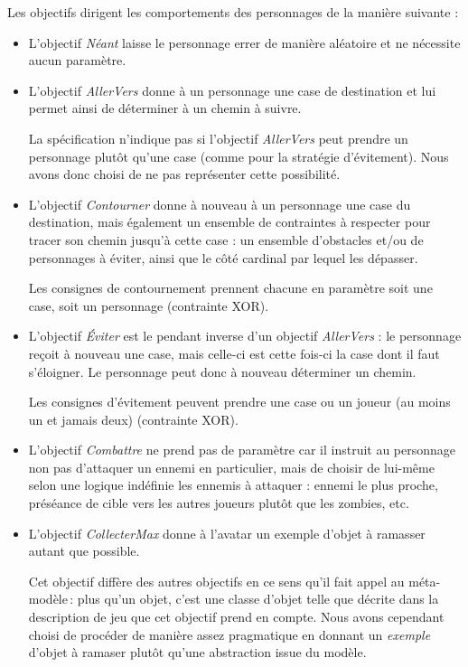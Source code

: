 \documentclass[oneside,a4paper]{book}
\begin{document}
Les objectifs dirigent les comportements des personnages de la manière suivante :
\begin{itemize}
    \item L'objectif \textit{Néant} laisse le personnage errer de manière aléatoire et ne nécessite aucun paramètre.
    \item L'objectif \textit{AllerVers} donne à un personnage une case de destination et lui permet ainsi de déterminer à un chemin à suivre.
    \begin{tcolorbox}
        La spécification n'indique pas si l'objectif \textit{AllerVers} peut prendre un personnage plutôt qu'une case (comme pour la stratégie d'évitement). Nous avons donc choisi de ne pas représenter cette possibilité.
    \end{tcolorbox}
    \item L'objectif \textit{Contourner} donne à nouveau à un personnage une case du destination, mais également un ensemble de contraintes à respecter pour tracer son chemin jusqu'à cette case : un ensemble d'obstacles et/ou de personnages à éviter, ainsi que le côté cardinal par lequel les dépasser.
    \begin{tcolorbox}
        Les consignes de contournement prennent chacune en paramètre soit une case, soit un personnage (contrainte XOR).
    \end{tcolorbox}
    \item L'objectif \textit{Éviter} est le pendant inverse d'un objectif \textit{AllerVers} : le personnage reçoit à nouveau une case, mais celle-ci est cette fois-ci la case dont il faut s'éloigner. Le personnage peut donc à nouveau déterminer un chemin. 
    \begin{tcolorbox}
        Les consignes d'évitement peuvent prendre une case ou un joueur (au moins un et jamais deux) (contrainte XOR).
    \end{tcolorbox}
    \item L'objectif \textit{Combattre} ne prend pas de paramètre car il instruit au personnage non pas d'attaquer un ennemi en particulier, mais de choisir de lui-même selon une logique indéfinie les ennemis à attaquer : ennemi le plus proche, préséance de cible vers les autres joueurs plutôt que les zombies, etc.
    \item L'objectif \textit{CollecterMax} donne à l'avatar un exemple d'objet à ramasser autant que possible.
    \begin{tcolorbox}
        Cet objectif diffère des autres objectifs en ce sens qu'il fait appel au méta-modèle\,: plus qu'un objet, c'est une classe d'objet telle que décrite dans la description de jeu que cet objectif prend en compte. Nous avons cependant choisi de procéder de manière assez pragmatique en donnant un \textit{exemple} d'objet à ramaser plutôt qu'une abstraction issue du modèle.
    \end{tcolorbox}
\end{itemize}
\end{document}
